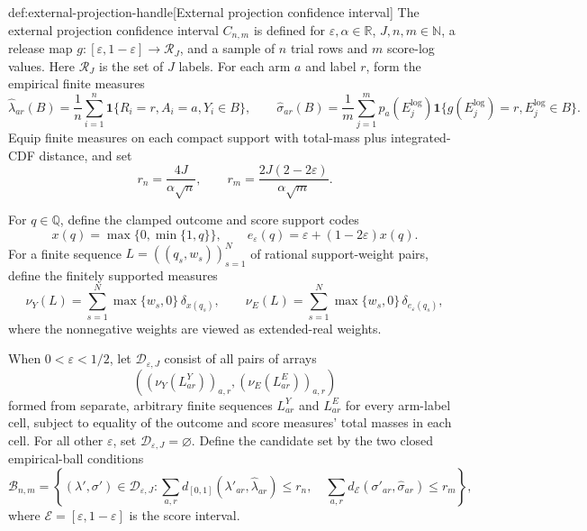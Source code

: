 \documentclass[11pt]{article}
\begin{document}
\begin{definitionv}{def:external-projection-handle}[External projection confidence interval]
The external projection confidence interval \(C_{n,m}\) is defined for \(\varepsilon,\alpha\in\mathbb R\), \(J,n,m\in\mathbb N\), a release map \(g:[\varepsilon,1-\varepsilon]\to\mathcal R_J\), and a sample of \(n\) trial rows and \(m\) score-log values. Here \(\mathcal R_J\) is the set of \(J\) labels. For each arm \(a\) and label \(r\), form the empirical finite measures
\[
\widehat\lambda_{ar}(B)
=\frac1n\sum_{i=1}^{n}\mathbf 1\{R_i=r,A_i=a,Y_i\in B\},
\qquad
\widehat\sigma_{ar}(B)
=\frac1m\sum_{j=1}^{m}p_a(E_j^{\mathrm{log}})
\mathbf 1\{g(E_j^{\mathrm{log}})=r,E_j^{\mathrm{log}}\in B\}.
\]
Equip finite measures on each compact support with total-mass plus integrated-CDF distance, and set
\[
r_n=\frac{4J}{\alpha\sqrt n},
\qquad
r_m=\frac{2J(2-2\varepsilon)}{\alpha\sqrt m}.
\]

For \(q\in\mathbb Q\), define the clamped outcome and score support codes
\[
x(q)=\max\{0,\min\{1,q\}\},
\qquad
e_\varepsilon(q)=\varepsilon+(1-2\varepsilon)x(q).
\]
For a finite sequence \(L=((q_s,w_s))_{s=1}^{N}\) of rational support-weight pairs, define the finitely supported measures
\[
\nu_Y(L)=\sum_{s=1}^{N}\max\{w_s,0\}\,\delta_{x(q_s)},
\qquad
\nu_E(L)=\sum_{s=1}^{N}\max\{w_s,0\}\,\delta_{e_\varepsilon(q_s)},
\]
where the nonnegative weights are viewed as extended-real weights.

When \(0<\varepsilon<1/2\), let \(\mathcal D_{\varepsilon,J}\) consist of all pairs of arrays
\[
\left(
(\nu_Y(L^Y_{ar}))_{a,r},
(\nu_E(L^E_{ar}))_{a,r}
\right)
\]
formed from separate, arbitrary finite sequences \(L^Y_{ar}\) and \(L^E_{ar}\) for every arm-label cell, subject to equality of the outcome and score measures' total masses in each cell. For all other \(\varepsilon\), set \(\mathcal D_{\varepsilon,J}=\varnothing\). Define the candidate set by the two closed empirical-ball conditions
\[
\mathcal B_{n,m}
=
\left\{
(\lambda',\sigma')\in\mathcal D_{\varepsilon,J}:
\sum_{a,r}d_{[0,1]}(\lambda'_{ar},\widehat\lambda_{ar})\le r_n,\quad
\sum_{a,r}d_{\mathcal E}(\sigma'_{ar},\widehat\sigma_{ar})\le r_m
\right\},
\]
where \(\mathcal E=[\varepsilon,1-\varepsilon]\) is the score interval.


\end{definitionv}
\end{document}

